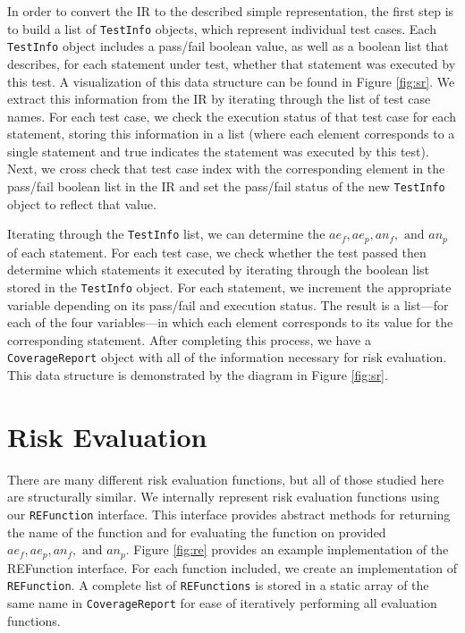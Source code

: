In order to convert the IR to the described simple representation, the first step is to build
a list of \texttt{TestInfo} objects, which represent individual test cases.  Each \texttt{TestInfo}
object includes a pass/fail boolean value, as well as a boolean list that describes, for each
statement under test, whether that statement was executed by this test.  A visualization of this
data structure can be found in Figure \ref{fig:sr}. We extract this information 
from the IR by iterating through the list of test case names.  For each test case, we check the
execution status of that test case for each statement, storing this information in a list (where
each element corresponds to a single statement and true indicates the statement was executed by this
test).  Next, we cross check that test case index with the corresponding element in the pass/fail
boolean list in the IR and set the pass/fail status of the new \texttt{TestInfo} object to reflect
that value.


Iterating through the \texttt{TestInfo} list, we can determine the $ae_f, ae_p, an_f, \text{ and } an_p$
of each statement.  For each test case, we check whether the test passed then determine which statements
it executed by iterating through the boolean list stored in the \texttt{TestInfo} object.  For each
statement, we increment the appropriate variable depending on its pass/fail and execution status.  The
result is a list---for each of the four variables---in which each element corresponds to its value for
the corresponding statement.  After completing this process, we have a \texttt{CoverageReport} object
with all of the information necessary for risk evaluation.  This data structure is demonstrated by the 
diagram in Figure \ref{fig:sr}.

\section{Risk Evaluation} \label{sec:re}

There are many different risk evaluation functions, but all of those studied here are structurally similar.  We internally
represent risk evaluation functions using our \texttt{REFunction} interface.  This interface provides
abstract methods for returning the name of the function and for evaluating the function on provided
$ae_f, ae_p, an_f, \text{ and } an_p$.  Figure \ref{fig:re} provides an example implementation of
the REFunction interface.  For each function included, we create an implementation of
\texttt{REFunction}.  A complete list of \texttt{REFunctions} is stored in a static array of the
same name in \texttt{CoverageReport} for ease of iteratively performing all evaluation functions.  

